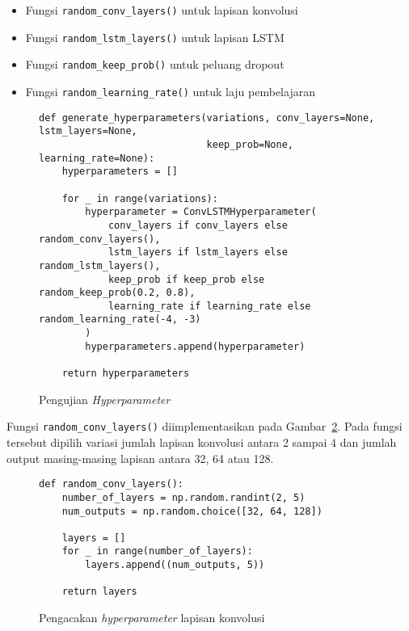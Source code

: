 \begin{itemize}
    \item Fungsi \texttt{random_conv_layers()} untuk lapisan konvolusi
    \item Fungsi \texttt{random_lstm_layers()} untuk lapisan LSTM
    \item Fungsi \texttt{random_keep_prob()} untuk peluang dropout
    \item Fungsi \texttt{random_learning_rate()} untuk laju pembelajaran
\end{itemize}

\begin{figure}[h]
\begin{verbatim}
def generate_hyperparameters(variations, conv_layers=None, lstm_layers=None,
                             keep_prob=None, learning_rate=None):
    hyperparameters = []

    for _ in range(variations):
        hyperparameter = ConvLSTMHyperparameter(
            conv_layers if conv_layers else random_conv_layers(),
            lstm_layers if lstm_layers else random_lstm_layers(),
            keep_prob if keep_prob else random_keep_prob(0.2, 0.8),
            learning_rate if learning_rate else random_learning_rate(-4, -3)
        )
        hyperparameters.append(hyperparameter)

    return hyperparameters
\end{verbatim}
\caption{Pengujian \textit{Hyperparameter}}
\label{listing:har-generate-hyperparameter}
\end{figure}

Fungsi \texttt{random_conv_layers()} diimplementasikan pada Gambar~\ref{listing:har-random-conv-layers}. Pada fungsi tersebut dipilih variasi jumlah lapisan konvolusi antara 2 sampai 4 dan jumlah output masing-masing lapisan antara 32, 64 atau 128.

\begin{figure}[h]
\begin{verbatim}
def random_conv_layers():
    number_of_layers = np.random.randint(2, 5)
    num_outputs = np.random.choice([32, 64, 128])

    layers = []
    for _ in range(number_of_layers):
        layers.append((num_outputs, 5))

    return layers
\end{verbatim}
\caption{Pengacakan \textit{hyperparameter} lapisan konvolusi}
\label{listing:har-random-conv-layers}
\end{figure}

